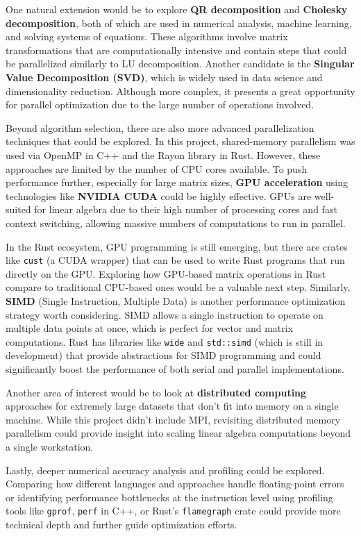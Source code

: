 \documentclass[12pt]{article}
\begin{document}
One natural extension would be to explore \textbf{QR decomposition} and \textbf{Cholesky decomposition}, both of which are used in numerical analysis,
machine learning, and solving systems of equations. These algorithms involve matrix transformations that are computationally intensive and contain
steps that could be parallelized similarly to LU decomposition. Another candidate is the \textbf{Singular Value Decomposition (SVD)}, which is widely
used in data science and dimensionality reduction. Although more complex, it presents a great opportunity for parallel optimization due to the large number
of operations involved.

Beyond algorithm selection, there are also more advanced parallelization techniques that could be explored. In this project, shared-memory
parallelism was used via OpenMP in C++ and the Rayon library in Rust. However, these approaches are limited by the number of CPU cores available.
To push performance further, especially for large matrix sizes, \textbf{GPU acceleration} using technologies like \textbf{NVIDIA CUDA} could be
highly effective. GPUs are well-suited for linear algebra due to their high number of processing cores and fast context switching, allowing massive
numbers of computations to run in parallel.

In the Rust ecosystem, GPU programming is still emerging, but there are crates like \texttt{cust} (a CUDA wrapper) that can be used to write Rust
programs that run directly on the GPU. Exploring how GPU-based matrix operations in Rust compare to traditional CPU-based ones would be a valuable
next step. Similarly, \textbf{SIMD} (Single Instruction, Multiple Data) is another performance optimization strategy worth considering. SIMD allows
a single instruction to operate on multiple data points at once, which is perfect for vector and matrix computations. Rust has libraries like
\texttt{wide} and \texttt{std::simd} (which is still in development) that provide abstractions for SIMD programming and could significantly boost the
performance of both serial and parallel implementations.

Another area of interest would be to look at \textbf{distributed computing} approaches for extremely large datasets that don't fit into memory on a
single machine. While this project didn't include MPI, revisiting distributed memory parallelism could provide insight into scaling linear algebra computations beyond a single workstation.

Lastly, deeper numerical accuracy analysis and profiling could be explored. Comparing how different languages and approaches handle
floating-point errors or identifying performance bottlenecks at the instruction level using profiling tools like \texttt{gprof}, \texttt{perf} in C++, or
Rust's \texttt{flamegraph} crate could provide more technical depth and further guide optimization efforts.
\end{document}

